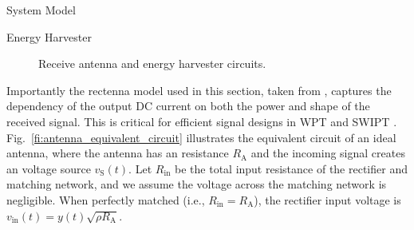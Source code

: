 \documentclass[journal]{IEEEtran}
\begin{document}
\begin{section}{System Model}
		\begin{subsection}{Energy Harvester}
			\begin{figure}[!t]
				\centering
				\caption{Receive antenna and energy harvester circuits.}
			\end{figure}

			Importantly the rectenna model used in this section, taken from \cite{Clerckx2016a}, captures the dependency of the output DC current on both the power and shape of the received signal. This is critical for efficient signal designs in WPT and SWIPT \cite{Clerckx2021}. Fig.~\ref{fi:antenna_equivalent_circuit} illustrates the equivalent circuit of an ideal antenna, where the antenna has an resistance $R_{\mathrm{A}}$ and the incoming signal creates an voltage source $v_{\mathrm{S}}(t)$. Let $R_{\mathrm{in}}$ be the total input resistance of the rectifier and matching network, and we assume the voltage across the matching network is negligible. When perfectly matched (i.e., $R_{\mathrm{in}}=R_{\mathrm{A}}$), the rectifier input voltage is $v_{\mathrm{in}}(t)=y(t)\sqrt{\rho R_{\mathrm{A}}}$.


\end{subsection}
\end{section}
\end{document}

